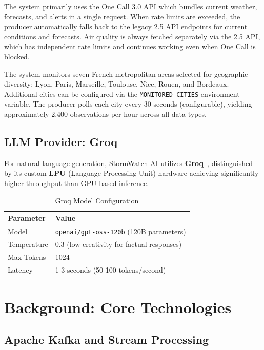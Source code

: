 \documentclass[11pt,a4paper]{article}
\newcommand{\keyword}[1]{\textcolor{primary}{\textbf{#1}}}
\begin{document}
The system primarily uses the One Call 3.0 API which bundles current weather, forecasts, and alerts in a single request. When rate limits are exceeded, the producer automatically falls back to the legacy 2.5 API endpoints for current conditions and forecasts. Air quality is always fetched separately via the 2.5 API, which has independent rate limits and continues working even when One Call is blocked.

The system monitors seven French metropolitan areas selected for geographic diversity: Lyon, Paris, Marseille, Toulouse, Nice, Rouen, and Bordeaux. Additional cities can be configured via the \texttt{MONITORED\_CITIES} environment variable. The producer polls each city every 30 seconds (configurable), yielding approximately 2,400 observations per hour across all data types.

\subsection{LLM Provider: Groq}

For natural language generation, StormWatch AI utilizes \keyword{Groq}~\cite{groq}, distinguished by its custom \textbf{LPU} (Language Processing Unit) hardware achieving significantly higher throughput than GPU-based inference.

\begin{table}[H]
\centering
\caption{Groq Model Configuration}
\renewcommand{\arraystretch}{1.2}
\begin{tabular}{ll}
\toprule
\textbf{Parameter} & \textbf{Value} \\
\midrule
Model & \texttt{openai/gpt-oss-120b} (120B parameters) \\
Temperature & 0.3 (low creativity for factual responses) \\
Max Tokens & 1024 \\
Latency & 1-3 seconds (50-100 tokens/second) \\
\bottomrule
\end{tabular}
\end{table}

\newpage
\section{Background: Core Technologies}

\subsection{Apache Kafka and Stream Processing}
\end{document}
